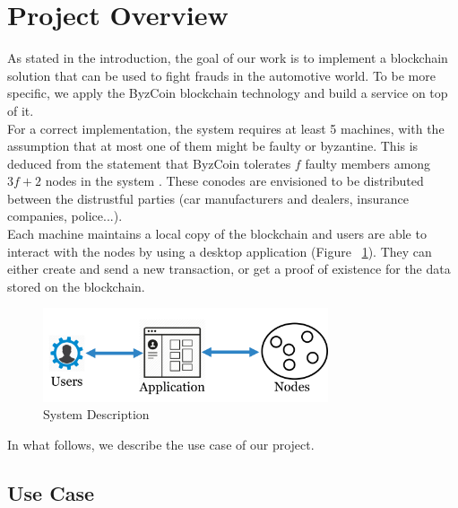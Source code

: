 \section{Project Overview} \label{Overview}

As stated in the introduction, the goal of our work is to implement a blockchain solution that can be used to fight frauds in the automotive world. To be more specific, we apply the ByzCoin \cite{ByzCoin Impl} blockchain technology and build a service on top of it.\\
\newline
For a correct implementation, the system requires at least 5 machines, with the assumption that at most one of them might be faulty or byzantine. This is deduced from the statement that ByzCoin tolerates $f$ faulty members among $3f + 2$ nodes in the system \cite{ByzCoin}. These conodes are envisioned to be distributed between the distrustful parties (car manufacturers and dealers, insurance companies, police...).\\
\newline
Each machine maintains a local copy of the blockchain and users are able to interact with the nodes by using a desktop application (Figure ~\ref{System Description}). They can either create and send a new transaction, or get a proof of existence for the data stored on the blockchain.
\begin{figure}[H]
    \centering
    \includegraphics[width=0.75\textwidth]{Figures/system.png}
    \caption{System Description}
    \label{System Description}
\end{figure}
\noindent
In what follows, we describe the use case of our project.

\subsection{Use Case}

